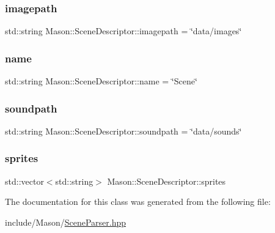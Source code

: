 \hypertarget{class_mason_1_1_scene_descriptor_a32d312e0bb11e5e3f5419f5d3a6d002a}{}\label{class_mason_1_1_scene_descriptor_a32d312e0bb11e5e3f5419f5d3a6d002a} 
\subsubsection{\texorpdfstring{imagepath}{imagepath}}
{\footnotesize\ttfamily std\+::string Mason\+::\+Scene\+Descriptor\+::imagepath = \char`\"{}data/images\char`\"{}}

\hypertarget{class_mason_1_1_scene_descriptor_a847493eddb3e379f1b8e9308f2de8eb0}{}\label{class_mason_1_1_scene_descriptor_a847493eddb3e379f1b8e9308f2de8eb0} 
\subsubsection{\texorpdfstring{name}{name}}
{\footnotesize\ttfamily std\+::string Mason\+::\+Scene\+Descriptor\+::name = \char`\"{}Scene\char`\"{}}

\hypertarget{class_mason_1_1_scene_descriptor_acd7e349dc63b0692c2f4912765db2cbe}{}\label{class_mason_1_1_scene_descriptor_acd7e349dc63b0692c2f4912765db2cbe} 
\subsubsection{\texorpdfstring{soundpath}{soundpath}}
{\footnotesize\ttfamily std\+::string Mason\+::\+Scene\+Descriptor\+::soundpath = \char`\"{}data/sounds\char`\"{}}

\hypertarget{class_mason_1_1_scene_descriptor_a0037cbfd772bbacb81017de405276475}{}\label{class_mason_1_1_scene_descriptor_a0037cbfd772bbacb81017de405276475} 
\subsubsection{\texorpdfstring{sprites}{sprites}}
{\footnotesize\ttfamily std\+::vector$<$std\+::string$>$ Mason\+::\+Scene\+Descriptor\+::sprites}



The documentation for this class was generated from the following file\+:\begin{DoxyCompactItemize}
\item 
include/\+Mason/\hyperlink{_scene_parser_8hpp}{Scene\+Parser.\+hpp}\end{DoxyCompactItemize}
